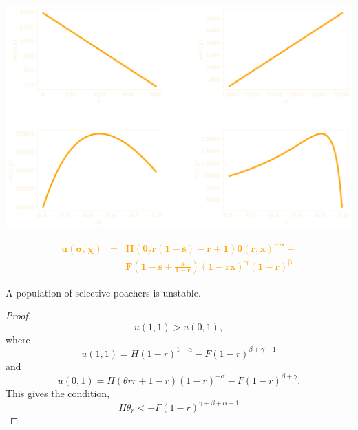 \documentclass{beamer}
\begin{document}
\begin{frame}
    \begin{center}
    \includegraphics[width=.8\textwidth]{static/utility}
    \end{center}
\end{frame}

\begin{frame}
    \textcolor{orange}{
    \Large{
        \begin{eqnarray*}
            \mathbf{u(\sigma, \chi)} &=&
            \mathbf{H (\theta_r r(1 - s) - r + 1) \theta(r, x)^{-\alpha} -}
        \\ && \mathbf{F \left(1 - s + \frac{s}{1 - r} \right)(1-rx)^{\gamma}(1 - r)^{\beta}}
    \end{eqnarray*}
    }}
    \end{frame}

%     
%     

\begin{frame}
    \centering
    \footnotesize
    \begin{theorem}[Selective]
    A population of selective poachers is unstable.
    \end{theorem}

    \begin{proof}
    \[u(1, 1)  > u(0, 1),\]
    where
    \[u(1, 1) = H(1 - r)^{1 - \alpha} − F (1 - r)^{\beta + \gamma - 1}\]
    and
    \[u(0, 1) = H(\theta{r} r + 1 - r)(1 - r)^{-\alpha} - F (1 - r)^{\beta + \gamma}.\]
    This gives the condition,
    \[H\theta_{r} < -F (1 - r)^{\gamma + \beta + \alpha -1}\]
    \end{proof}
\end{frame}
\end{document}
